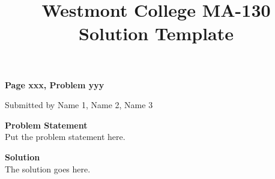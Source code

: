 \documentclass[letterpaper, 11pt]{article}
\title{Westmont College MA-130 Solution Template}
\begin{document}

\begin{center}
\Large \bf Page xxx, Problem yyy

\large Submitted by Name 1, Name 2, Name 3
\end{center}

\textbf{Problem Statement}\\
Put the problem statement here.

\bigskip

\textbf{Solution}\\
The solution goes here.






\clearpage

\end{document}
